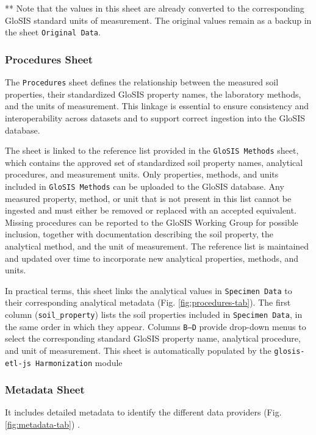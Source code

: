 \documentclass[
  10pt,
  b5paper,
  oneside]{book}
\begin{document}
** Note that the values in this sheet are already converted to the corresponding GloSIS standard units of measurement. The original values remain as a backup in the sheet \texttt{Original\ Data}.

\subsubsection{Procedures Sheet}\label{procedures-sheet}

The \texttt{Procedures} sheet defines the relationship between the measured soil properties, their standardized GloSIS property names, the laboratory methods, and the units of measurement. This linkage is essential to ensure consistency and interoperability across datasets and to support correct ingestion into the GloSIS database.

The sheet is linked to the reference list provided in the \texttt{GloSIS\ Methods} sheet, which contains the approved set of standardized soil property names, analytical procedures, and measurement units. Only properties, methods, and units included in \texttt{GloSIS\ Methods} can be uploaded to the GloSIS database. Any measured property, method, or unit that is not present in this list cannot be ingested and must either be removed or replaced with an accepted equivalent. Missing procedures can be reported to the GloSIS Working Group for possible inclusion, together with documentation describing the soil property, the analytical method, and the unit of measurement. The reference list is maintained and updated over time to incorporate new analytical properties, methods, and units.

In practical terms, this sheet links the analytical values in \texttt{Specimen\ Data} to their corresponding analytical metadata (Fig. \ref{fig:procedures-tab}). The first column (\texttt{soil\_property}) lists the soil properties included in \texttt{Specimen\ Data}, in the same order in which they appear. Columns \texttt{B–D} provide drop-down menus to select the corresponding standard GloSIS property name, analytical procedure, and unit of measurement. This sheet is automatically populated by the \texttt{glosis-etl-js\ Harmonization} module

\subsubsection{Metadata Sheet}\label{metadata-sheet}

It includes detailed metadata to identify the different data providers (Fig. \ref{fig:metadata-tab}) .
\end{document}

